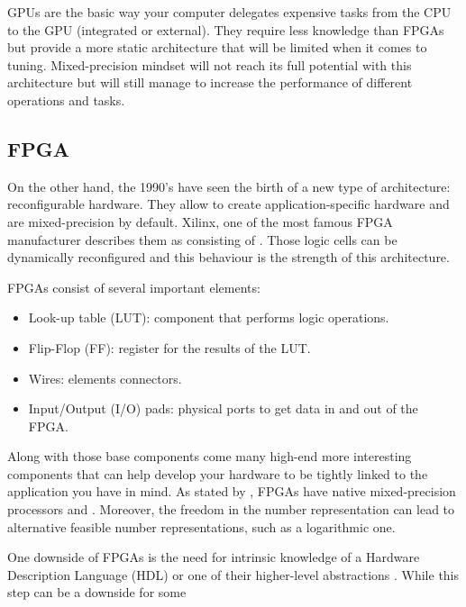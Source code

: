 GPUs are the basic way your computer delegates expensive tasks from the CPU to the GPU (integrated or external). They require less knowledge than FPGAs but provide a more static architecture that will be limited when it comes to tuning. Mixed-precision mindset will not reach its full potential with this architecture but will still manage to increase the performance of different operations and tasks.


\subsection{FPGA}

On the other hand, the 1990's have seen the birth of a new type of architecture: reconfigurable hardware. They allow to create application-specific hardware and are mixed-precision by default. Xilinx, one of the most famous FPGA manufacturer describes them \cite{Xilinx} as consisting of . Those logic cells can be dynamically reconfigured and this behaviour is the strength of this architecture.

FPGAs consist of several important elements:
\begin{itemize}
  \item Look-up table (LUT): component that performs logic operations.
  \item Flip-Flop (FF): register  for the results of the LUT.
  \item Wires: elements connectors.
  \item Input/Output (I/O) pads: physical ports to get data in and out of the FPGA.
\end{itemize}

Along with those base components come many high-end more interesting components that can help develop your hardware to be tightly linked to the application you have in mind. As stated by \cite{Goddeke2007}, FPGAs have native mixed-precision processors and . Moreover, the freedom in the number representation can lead to alternative feasible number representations, such as a logarithmic one.

One downside of FPGAs is the need for intrinsic knowledge of a Hardware Description Language (HDL) or one of their higher-level abstractions \cite{XuanSang2014}. While this step can be a downside for some
